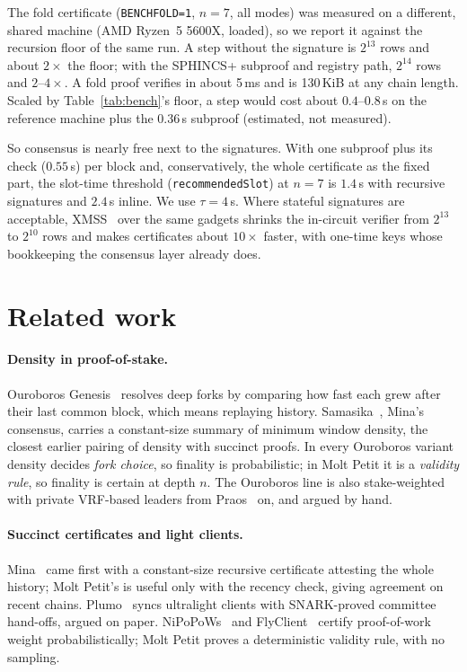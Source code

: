 \documentclass[10pt]{article}
\DeclareRobustCommand{\code}[1]{{\renewcommand{\_}{\textunderscore\allowbreak}\texttt{#1}}}
\begin{document}
The fold certificate (\code{BENCH\_FOLD=1}, $n = 7$, all modes) was
measured on a different, shared machine (AMD Ryzen~5 5600X, loaded), so
we report it against the recursion floor of the same run. A step without
the signature is $2^{13}$ rows and about $2\times$ the floor; with the
SPHINCS+ subproof and registry path, $2^{14}$ rows and $2$--$4\times$.
A fold proof verifies in about 5\,ms and is 130\,KiB at any chain
length. Scaled by Table~\ref{tab:bench}'s floor, a step would cost about
$0.4$--$0.8$\,s on the reference machine plus the $0.36$\,s subproof
(estimated, not measured).

So consensus is nearly free next to the signatures. With one subproof plus
its check ($0.55$\,s) per block and, conservatively, the whole certificate
as the fixed part, the slot-time threshold (\code{recommendedSlot}) at
$n = 7$ is $1.4$\,s with recursive signatures and $2.4$\,s inline. We use $\tau = 4$\,s. Where stateful signatures
are acceptable, XMSS~\cite{xmssrfc} over the same gadgets shrinks the
in-circuit verifier from $2^{13}$ to $2^{10}$ rows and makes certificates
about $10\times$ faster, with one-time keys whose bookkeeping the
consensus layer already does.

\section{Related work}
\label{sec:related}

\paragraph{Density in proof-of-stake.} Ouroboros Genesis~\cite{genesis}
resolves deep forks by comparing how fast each grew after their last
common block, which means replaying history. Samasika~\cite{samasika},
Mina's consensus, carries a constant-size summary of minimum window
density, the closest earlier pairing of density with succinct proofs.
In every Ouroboros variant density decides \emph{fork choice}, so
finality is probabilistic; in Molt Petit it is a \emph{validity rule},
so finality is certain at depth $n$. The Ouroboros line is also
stake-weighted with private VRF-based leaders from
Praos~\cite{praos,ouroboros} on, and argued by hand.

\paragraph{Succinct certificates and light clients.} Mina~\cite{mina}
came first with a constant-size recursive certificate attesting the whole
history; Molt Petit's is useful only with the recency check, giving
agreement on recent chains. Plumo~\cite{plumo} syncs ultralight clients
with SNARK-proved committee hand-offs, argued on paper.
NiPoPoWs~\cite{nipopow} and FlyClient~\cite{flyclient} certify
proof-of-work weight probabilistically; Molt Petit proves a deterministic
validity rule, with no sampling.
\end{document}
